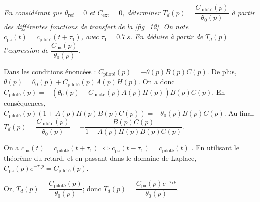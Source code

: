 \question{\label{q_24}}\textit{En considérant que  $\theta_{\text{ref}}=0$ et  $C_{\text{ext}}=0$, déterminer $T_d(p)=\dfrac{C_{\text{piloté}}(p)}{\theta_0(p)}$ à partir des différentes fonctions de transfert de la \autoref{fig_12}. On note $c_{\text{pa}}(t)=c_{\text{piloté}}(t+\tau_1)$, avec $\tau_1 = \SI{0,7}{s}$. En déduire à partir de $T_d(p)$ l'expression de $\dfrac{C_{\text{pa}}(p)}{\theta_0(p)}$.} %
\ifprof
\begin{corrige}
Dans les conditions énoncées : $C_{\text{piloté}}(p)=-\theta(p) B(p) C(p)$. De plus,$\theta(p)=\theta_0(p)+C_{\text{piloté}}(p) A(p) H(p)$. 
On a donc $C_{\text{piloté}}(p)=-\left( \theta_0(p)+C_{\text{piloté}}(p) A(p) H(p) \right) B(p) C(p)$.
En conséquences, $C_{\text{piloté}}(p)\left( 1+ A(p) H(p) B(p) C(p) \right)=- \theta_0(p) B(p) C(p)$.
Au final, $T_d(p)=\dfrac{C_{\text{piloté}}(p)}{\theta_0(p)} = -\dfrac{ B(p) C(p)}{ 1+ A(p) H(p) B(p) C(p)}$.


 On a $c_{\text{pa}}(t)=c_{\text{piloté}}(t+\tau_1)$ $\Leftrightarrow c_{\text{pa}}(t-\tau_1)=c_{\text{piloté}}(t) $ . En utilisant le théorème du retard, et en passant dans le domaine de Laplace, 
  $C_{\text{pa}}(p)e^{-\tau_1 p} =C_{\text{piloté}}(p)$. 
  
Or, $T_d(p)=\dfrac{C_{\text{piloté}}(p)}{\theta_0(p)}$; donc $T_d(p)=\dfrac{C_{\text{pa}}(p)e^{-\tau_1 p}}{\theta_0(p)}$.


\end{corrige}
\else
\fi

